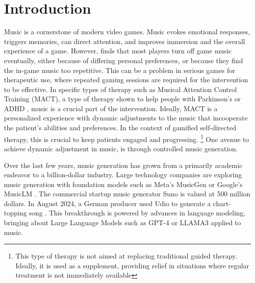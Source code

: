 

\chapter{Introduction}
\label{chap:intro}
\pagestyle{fancy}

Music is a cornerstone of modern video games. Music evokes emotional responses, triggers memories, can direct attention, and improves immersion and the overall experience of a game. However, \cite{Rogers_Weber_2019} finds that most players turn off game music eventually, either because of differing personal preferences, or because they find the in-game music too repetitive. This can be a problem in serious games for therapeutic use, where repeated gaming sessions are required for the intervention to be effective. In specific types of therapy such as Musical Attention Control Training (MACT), a type of therapy shown to help people with Parkinson's \cite{Park_Kim_2021} or ADHD \cite{Martin-Moratinos_Bella-Fernández_Blasco-Fontecilla_2023}, music is a crucial part of the intervention. Ideally, MACT is a personalized experience with dynamic adjustments to the music that incooperate the patient's abilities and preferences. In the context of gamified self-directed therapy, this is crucial to keep patients engaged and progressing. \footnote{This type of therapy is not aimed at replacing traditional guided therapy. Ideally, it is used as a supplement, providing relief in situations where regular treatment is not immediately available} One avenue to achieve dynamic adjustment in music, is through controlled music generation. 

Over the last few years, music generation has grown from a primarily academic endeavor to a billion-dollar industry. Large technology companies are exploring music generation with foundation models such as Meta’s MusicGen \cite{copet2023simple} or Google’s MusicLM 
\cite{Agostinelli_Denk_Borsos_Engel_Verzetti_Caillon_Huang_Jansen_Roberts_Tagliasacchi_et_al._2023}. The commercial startup music generator Suno is valued at 500 million dollars. In August 2024, a German producer used Udio to generate a chart-topping song \cite{Ferdinand_Meyen_2024}\cite{Stassen_2024}. This breakthrough is powered by advances in language modeling, bringing about Large Language Models such as GPT-4 or LLAMA3 applied to music.

